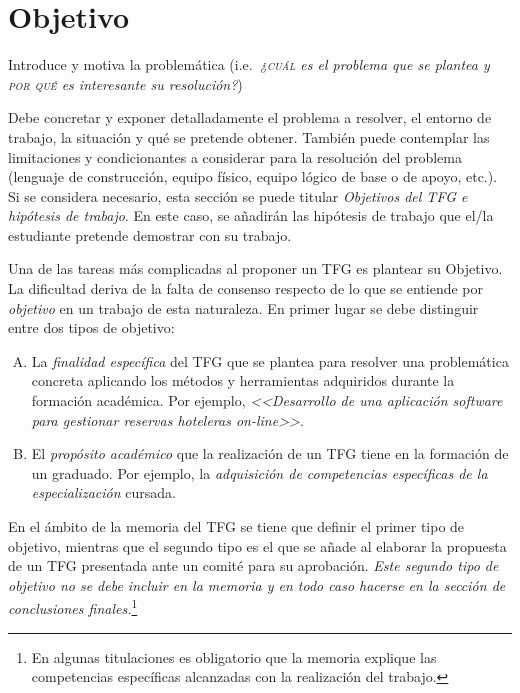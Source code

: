 \chapter{Objetivo}
\label{cap:Objetivo}

Introduce y motiva la problemática (i.e.\emph{\ ¿\textsc{cuál} es el problema que se plantea y \textsc{por qué} es interesante su resolución?})

Debe concretar y exponer detalladamente el problema a resolver, el entorno de 
trabajo, la situación y qué se pretende obtener. También puede contemplar las 
limitaciones y condicionantes a considerar para la resolución del problema 
(lenguaje de construcción, equipo físico, equipo lógico de base o de apoyo, 
etc.). Si se considera necesario, esta sección se puede titular 
\emph{Objetivos del TFG e hipótesis de trabajo}. En este caso, se añadirán 
las hipótesis de trabajo que el/la estudiante pretende demostrar con su trabajo.

Una de las tareas más complicadas al proponer un TFG es plantear su 
\textsf{Objetivo}. La dificultad deriva de la falta de consenso respecto de 
lo que se entiende por \emph{objetivo} en un trabajo de esta naturaleza. En 
primer lugar se debe distinguir entre dos tipos de objetivo:

\begin{enumerate}[(A)]
	\item La \emph{finalidad específica} del TFG que se plantea para resolver una problemática concreta aplicando los métodos y herramientas adquiridos durante la formación académica. Por ejemplo, \emph{<<Desarrollo de una aplicación software para gestionar reservas hoteleras \emph{on-line}>>}.
	
	\item El \emph{propósito académico} que la realización de un TFG tiene en la formación de un graduado. Por ejemplo, la \emph{adquisición de competencias específicas de la especialización} cursada.
\end{enumerate}

En el ámbito de la memoria del TFG se tiene que definir el primer tipo de objetivo, mientras que el segundo tipo es el que se añade al elaborar la propuesta de un TFG presentada ante un comité para su aprobación. \emph{Este segundo tipo de objetivo no se debe incluir en la memoria y en todo caso hacerse en la sección de conclusiones finales.}\footnote{En algunas titulaciones es obligatorio que la memoria explique las competencias específicas alcanzadas con la realización del trabajo.}

